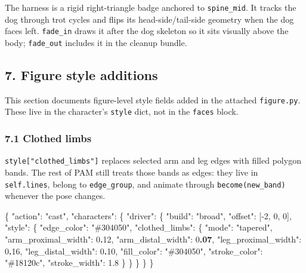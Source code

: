 \documentclass[
  12pt,
  letterpaper,
]{book}
\newenvironment{Shaded}{}{}
\newcommand{\DataTypeTok}[1]{\textcolor[rgb]{0.56,0.13,0.00}{#1}}
\newcommand{\DecValTok}[1]{\textcolor[rgb]{0.25,0.63,0.44}{#1}}
\newcommand{\ErrorTok}[1]{\textcolor[rgb]{1.00,0.00,0.00}{\textbf{#1}}}
\newcommand{\FloatTok}[1]{\textcolor[rgb]{0.25,0.63,0.44}{#1}}
\newcommand{\FunctionTok}[1]{\textcolor[rgb]{0.02,0.16,0.49}{#1}}
\newcommand{\OtherTok}[1]{\textcolor[rgb]{0.00,0.44,0.13}{#1}}
\newcommand{\StringTok}[1]{\textcolor[rgb]{0.25,0.44,0.63}{#1}}
\begin{document}
The harness is a rigid right-triangle badge anchored to
\texttt{spine\_mid}. It tracks the dog through trot cycles and flips its
head-side/tail-side geometry when the dog faces left. \texttt{fade\_in}
draws it after the dog skeleton so it sits visually above the body;
\texttt{fade\_out} includes it in the cleanup bundle.

\subsection{7. Figure style additions}\label{figure-style-additions}

This section documents figure-level style fields added in the attached
\texttt{figure.py}. These live in the character's \texttt{style} dict,
not in the \texttt{faces} block.

\subsubsection{7.1 Clothed limbs}\label{clothed-limbs}

\texttt{style{[}"clothed\_limbs"{]}} replaces selected arm and leg edges
with filled polygon bands. The rest of PAM still treats those bands as
edges: they live in \texttt{self.lines}, belong to \texttt{edge\_group},
and animate through \texttt{become(new\_band)} whenever the pose
changes.

\begin{Shaded}
\begin{Highlighting}[]
\FunctionTok{\{}
  \DataTypeTok{"action"}\FunctionTok{:} \StringTok{"cast"}\FunctionTok{,}
  \DataTypeTok{"characters"}\FunctionTok{:} \FunctionTok{\{}
    \DataTypeTok{"driver"}\FunctionTok{:} \FunctionTok{\{}
      \DataTypeTok{"build"}\FunctionTok{:} \StringTok{"broad"}\FunctionTok{,}
      \DataTypeTok{"offset"}\FunctionTok{:} \OtherTok{[}\DecValTok{{-}2}\OtherTok{,} \DecValTok{0}\OtherTok{,} \DecValTok{0}\OtherTok{]}\FunctionTok{,}
      \DataTypeTok{"style"}\FunctionTok{:} \FunctionTok{\{}
        \DataTypeTok{"edge\_color"}\FunctionTok{:} \StringTok{"\#304050"}\FunctionTok{,}
        \DataTypeTok{"clothed\_limbs"}\FunctionTok{:} \FunctionTok{\{}
          \DataTypeTok{"mode"}\FunctionTok{:} \StringTok{"tapered"}\FunctionTok{,}
          \DataTypeTok{"arm\_proximal\_width"}\FunctionTok{:} \DecValTok{0}\ErrorTok{.}\DecValTok{12}\FunctionTok{,}
          \DataTypeTok{"arm\_distal\_width"}\FunctionTok{:} \DecValTok{0}\ErrorTok{.07}\FunctionTok{,}
          \DataTypeTok{"leg\_proximal\_width"}\FunctionTok{:} \DecValTok{0}\ErrorTok{.}\DecValTok{16}\FunctionTok{,}
          \DataTypeTok{"leg\_distal\_width"}\FunctionTok{:} \DecValTok{0}\ErrorTok{.}\DecValTok{10}\FunctionTok{,}
          \DataTypeTok{"fill\_color"}\FunctionTok{:} \StringTok{"\#304050"}\FunctionTok{,}
          \DataTypeTok{"stroke\_color"}\FunctionTok{:} \StringTok{"\#18120c"}\FunctionTok{,}
          \DataTypeTok{"stroke\_width"}\FunctionTok{:} \FloatTok{1.8}
        \FunctionTok{\}}
      \FunctionTok{\}}
    \FunctionTok{\}}
  \FunctionTok{\}}
\FunctionTok{\}}
\end{Highlighting}
\end{Shaded}
\end{document}
